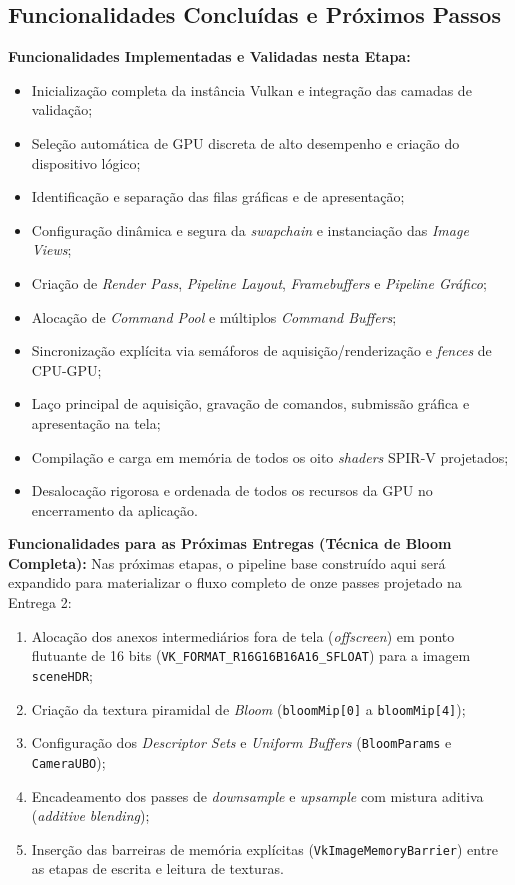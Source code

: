 \subsection{Funcionalidades Concluídas e Próximos Passos}

\textbf{Funcionalidades Implementadas e Validadas nesta Etapa:}
\begin{itemize}
    \setlength{\itemsep}{0pt}
    \item Inicialização completa da instância Vulkan e integração das camadas de validação;
    \item Seleção automática de GPU discreta de alto desempenho e criação do dispositivo lógico;
    \item Identificação e separação das filas gráficas e de apresentação;
    \item Configuração dinâmica e segura da \textit{swapchain} e instanciação das \textit{Image Views};
    \item Criação de \textit{Render Pass}, \textit{Pipeline Layout}, \textit{Framebuffers} e \textit{Pipeline Gráfico};
    \item Alocação de \textit{Command Pool} e múltiplos \textit{Command Buffers};
    \item Sincronização explícita via semáforos de aquisição/renderização e \textit{fences} de CPU-GPU;
    \item Laço principal de aquisição, gravação de comandos, submissão gráfica e apresentação na tela;
    \item Compilação e carga em memória de todos os oito \textit{shaders} SPIR-V projetados;
    \item Desalocação rigorosa e ordenada de todos os recursos da GPU no encerramento da aplicação.
\end{itemize}

\textbf{Funcionalidades para as Próximas Entregas (Técnica de Bloom Completa):}
Nas próximas etapas, o pipeline base construído aqui será expandido para materializar o fluxo completo de onze passes projetado na Entrega 2:
\begin{enumerate}
    \setlength{\itemsep}{0pt}
    \item Alocação dos anexos intermediários fora de tela (\textit{offscreen}) em ponto flutuante de 16 bits (\texttt{VK\_FORMAT\_R16G16B16A16\_SFLOAT}) para a imagem \texttt{sceneHDR};
    \item Criação da textura piramidal de \textit{Bloom} (\texttt{bloomMip[0]} a \texttt{bloomMip[4]});
    \item Configuração dos \textit{Descriptor Sets} e \textit{Uniform Buffers} (\texttt{BloomParams} e \texttt{CameraUBO});
    \item Encadeamento dos passes de \textit{downsample} e \textit{upsample} com mistura aditiva (\textit{additive blending});
    \item Inserção das barreiras de memória explícitas (\texttt{VkImageMemoryBarrier}) entre as etapas de escrita e leitura de texturas.
\end{enumerate}
\fussy
